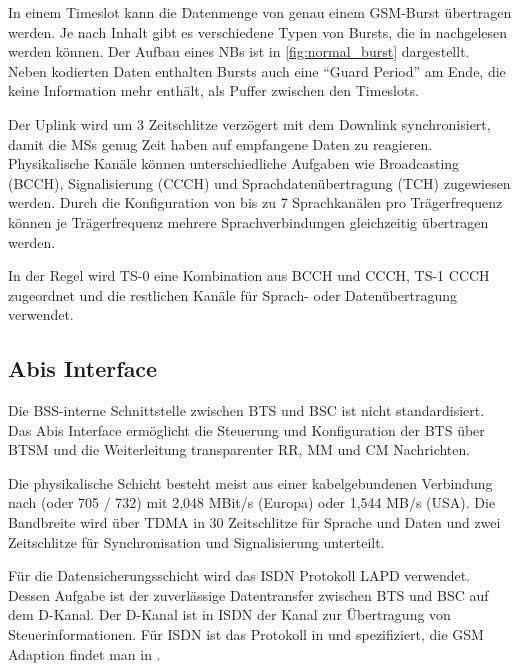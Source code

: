 In einem Timeslot kann die Datenmenge von genau einem \ac{GSM}-Burst übertragen werden. Je nach Inhalt gibt es verschiedene Typen von Bursts, die in  nachgelesen werden können. Der Aufbau eines \acp{NB} ist in \autoref{fig:normal_burst} dargestellt. Neben kodierten Daten enthalten Bursts auch eine "`Guard Period"' am Ende, die keine Information mehr enthält, als Puffer zwischen den Timeslots.

Der Uplink wird um 3 Zeitschlitze verzögert mit dem Downlink synchronisiert, damit die \acp{MS} genug Zeit haben auf empfangene Daten zu reagieren. Physikalische Kanäle können unterschiedliche Aufgaben wie Broadcasting (\ac{BCCH}), Signalisierung (\ac{CCCH}) und Sprachdatenübertragung (\ac{TCH}) zugewiesen werden. Durch die Konfiguration von bis zu 7 Sprachkanälen pro Trägerfrequenz können je Trägerfrequenz mehrere Sprachverbindungen gleichzeitig übertragen werden. \citep{schnabel2003kommunikationstechnik}

In der Regel wird TS-0 eine Kombination aus \ac{BCCH} und \ac{CCCH}, TS-1 \ac{CCCH} zugeordnet und die restlichen Kanäle für Sprach- oder Datenübertragung verwendet.

\subsection{Abis Interface} \label{hdl:a_abis}

Die \ac{BSS}-interne Schnittstelle zwischen \ac{BTS} und \ac{BSC} ist nicht standardisiert. Das Abis Interface ermöglicht die Steuerung und Konfiguration der \ac{BTS} über \ac{BTSM} und die Weiterleitung transparenter \ac{RR}, \ac{MM} und \ac{CM} Nachrichten.

Die physikalische Schicht besteht meist aus einer kabelgebundenen Verbindung nach  (oder 705 / 732) mit 2,048 MBit/s (Europa) oder 1,544 MB/s (USA). Die Bandbreite wird über \ac{TDMA} in 30 Zeitschlitze für Sprache und Daten und zwei Zeitschlitze für Synchronisation und Signalisierung unterteilt.

Für die Datensicherungsschicht wird das \ac{ISDN} Protokoll \ac{LAPD} verwendet. Dessen Aufgabe ist der zuverlässige Datentransfer zwischen \ac{BTS} und \ac{BSC} auf dem D-Kanal. Der D-Kanal ist in \ac{ISDN} der Kanal zur Übertragung von Steuerinformationen. Für \ac{ISDN} ist das Protokoll in  und  spezifiziert, die \ac{GSM} Adaption findet man in .

